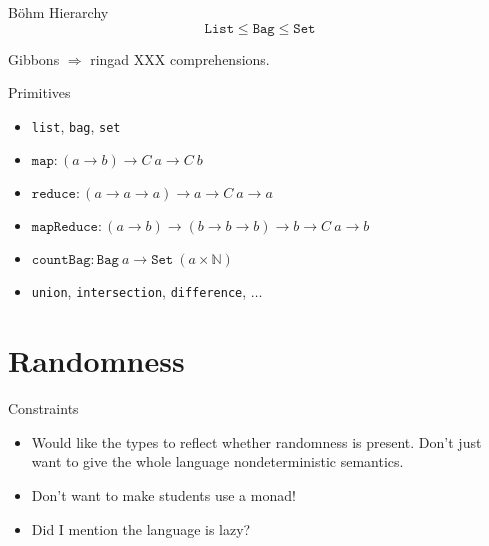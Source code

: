 \documentclass[xcolor=svgnames,12pt,aspectratio=169]{beamer}
\newenvironment{xframe}[1][]
  {\begin{frame}[fragile,environment=xframe,#1]}
  {\end{frame}}
\begin{document}
\begin{xframe}{B\"ohm Hierarchy}
  \[ \texttt{List} \leq \texttt{Bag} \leq \texttt{Set} \]
\end{xframe}

\begin{xframe}
  Gibbons $\Rightarrow$ ringad XXX comprehensions.
\end{xframe}

\begin{xframe}{Primitives}
  \begin{itemize}
  \item \texttt{list}, \texttt{bag}, \texttt{set}
  \item $\texttt{map} : (a \to b) \to C\ a \to C\ b$
  \item $\texttt{reduce} : (a \to a \to a) \to a \to C\ a \to a$
  \item $\texttt{mapReduce} : (a \to b) \to (b \to b \to b) \to b \to
    C\ a \to b$
  \item $\texttt{countBag} : \texttt{Bag}\ a \to \texttt{Set}\ (a
    \times \mathbb{N})$
  \item \texttt{union}, \texttt{intersection}, \texttt{difference}, $\dots$
  \end{itemize}
\end{xframe}

\section{Randomness}


\begin{xframe}{Constraints}
  \begin{itemize}
  \item<+-> Would like the types to reflect whether randomness is
    present.  Don't just want to give the whole language
    nondeterministic semantics.
  \item<+-> Don't want to make students use a monad!
  \item<+-> Did I mention the language is lazy?
  \end{itemize}
  \begin{center}
  \end{center}
\end{xframe}
\end{document}
